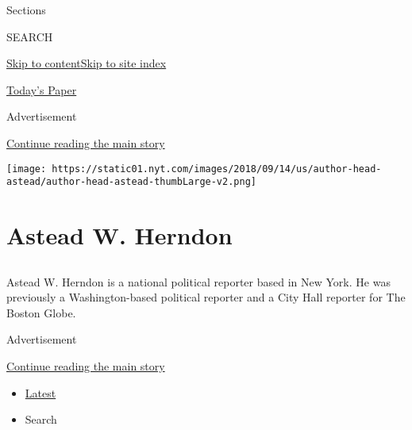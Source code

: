 Sections

SEARCH

\protect\hyperlink{site-content}{Skip to
content}\protect\hyperlink{site-index}{Skip to site index}

\href{https://myaccount.nytimes.com/auth/login?response_type=cookie\&client_id=vi}{}

\href{https://www.nytimes.com/section/todayspaper}{Today's Paper}

Advertisement

\protect\hyperlink{after-top}{Continue reading the main story}

\texttt{[image: https://static01.nyt.com/images/2018/09/14/us/author-head-astead/author-head-astead-thumbLarge-v2.png]}

\hypertarget{astead-w-herndon}{%
\section{Astead W. Herndon}\label{astead-w-herndon}}

\subsection{}

Astead W. Herndon is a national political reporter based in New York. He
was previously a Washington-based political reporter and a City Hall
reporter for The Boston Globe.

Advertisement

\protect\hyperlink{after-mid1}{Continue reading the main story}

\begin{itemize}
\tightlist
\item
  \protect\hyperlink{stream-panel}{Latest}
\item
  Search
\end{itemize}

